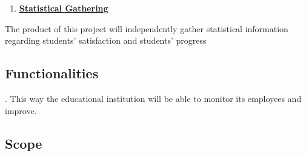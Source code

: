 \documentclass[12pt,a4paper]{article}
\begin{document}
    \begin{enumerate}
        \setcounter{enumi}{\thenumberedCntBD}
        \item \textbf{\underline{Statistical Gathering}}
        \setcounter{numberedCntBD}{\theenumi}
    \end{enumerate}
    The product of this project will independently gather statistical
    information regarding students' satisfaction and students' progress  \subsection{Functionalities}.
    This way the educational institution will be able to monitor its
    employees and improve.

    \newpage

    \subsection{Scope}\label{section:_Toc146371246}
\end{document}
